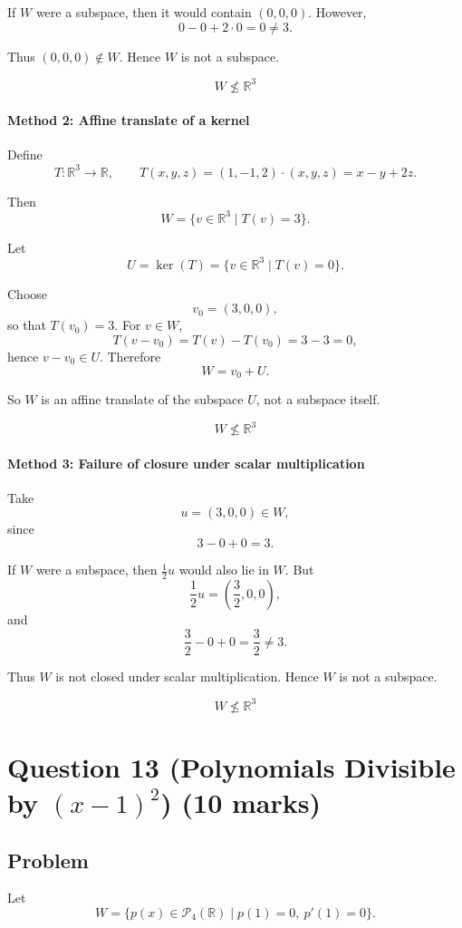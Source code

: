 \documentclass[12pt]{article}
\begin{document}
If \(W\) were a subspace, then it would contain \((0,0,0)\). However,
\[
0-0+2\cdot 0=0\neq 3.
\]

Thus \((0,0,0)\notin W\). Hence \(W\) is not a subspace.

\[
\boxed{W\not\le \mathbb R^3}
\]

\paragraph{Method 2: Affine translate of a kernel}

Define
\[
T:\mathbb R^3\to\mathbb R,\qquad
T(x,y,z)=(1,-1,2)\cdot(x,y,z)=x-y+2z.
\]

Then
\[
W=\{v\in\mathbb R^3\mid T(v)=3\}.
\]

Let
\[
U=\ker(T)=\{v\in\mathbb R^3\mid T(v)=0\}.
\]

Choose
\[
v_0=(3,0,0),
\]
so that \(T(v_0)=3\). For \(v\in W\),
\[
T(v-v_0)=T(v)-T(v_0)=3-3=0,
\]
hence \(v-v_0\in U\). Therefore
\[
W=v_0+U.
\]

So \(W\) is an affine translate of the subspace \(U\), not a subspace itself.

\[
\boxed{W\not\le \mathbb R^3}
\]
\newpage
\paragraph{Method 3: Failure of closure under scalar multiplication}

Take
\[
u=(3,0,0)\in W,
\]
since
\[
3-0+0=3.
\]

If \(W\) were a subspace, then \(\frac12 u\) would also lie in \(W\). But
\[
\frac12u=\left(\frac32,0,0\right),
\]
and
\[
\frac32-0+0=\frac32\neq 3.
\]

Thus \(W\) is not closed under scalar multiplication. Hence \(W\) is not a subspace.

\[
\boxed{W\not\le \mathbb R^3}
\]

\newpage
\section{Question 13 (Polynomials Divisible by \((x-1)^2\)) \hfill (10 marks)}
\subsection{Problem}

Let
\[
W=\{p(x)\in\mathcal P_4(\mathbb R)\mid p(1)=0,\ p'(1)=0\}.
\]
\end{document}
